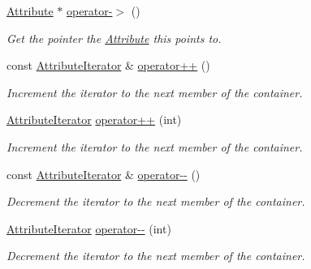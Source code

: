 \begin{DoxyCompactItemize}
\hyperlink{classphys_1_1xml_1_1Attribute}{Attribute} $\ast$ \hyperlink{classphys_1_1xml_1_1AttributeIterator_a77fb7dfd9b834d6663201870e8550217}{operator-\/$>$} ()
\begin{DoxyCompactList}\small\item\em Get the pointer the \hyperlink{classphys_1_1xml_1_1Attribute}{Attribute} this points to. \item\end{DoxyCompactList}\item 
\hypertarget{classphys_1_1xml_1_1AttributeIterator_ad09623beef0359e64bc6b5a2635cd34a}{
const \hyperlink{classphys_1_1xml_1_1AttributeIterator}{AttributeIterator} \& \hyperlink{classphys_1_1xml_1_1AttributeIterator_ad09623beef0359e64bc6b5a2635cd34a}{operator++} ()}
\label{de/d78/classphys_1_1xml_1_1AttributeIterator_ad09623beef0359e64bc6b5a2635cd34a}

\begin{DoxyCompactList}\small\item\em Increment the iterator to the next member of the container. \item\end{DoxyCompactList}\item 
\hyperlink{classphys_1_1xml_1_1AttributeIterator}{AttributeIterator} \hyperlink{classphys_1_1xml_1_1AttributeIterator_a2109817056f299a9f2b132ade6901800}{operator++} (int)
\begin{DoxyCompactList}\small\item\em Increment the iterator to the next member of the container. \item\end{DoxyCompactList}\item 
const \hyperlink{classphys_1_1xml_1_1AttributeIterator}{AttributeIterator} \& \hyperlink{classphys_1_1xml_1_1AttributeIterator_a76a060aab7cc7666cd5016035de714b0}{operator-\/-\/} ()
\begin{DoxyCompactList}\small\item\em Decrement the iterator to the next member of the container. \item\end{DoxyCompactList}\item 
\hyperlink{classphys_1_1xml_1_1AttributeIterator}{AttributeIterator} \hyperlink{classphys_1_1xml_1_1AttributeIterator_ab8b0d4867b14816c80cf74ac7a0a1561}{operator-\/-\/} (int)
\begin{DoxyCompactList}\small\item\em Decrement the iterator to the next member of the container. \item\end{DoxyCompactList}\end{DoxyCompactItemize}
